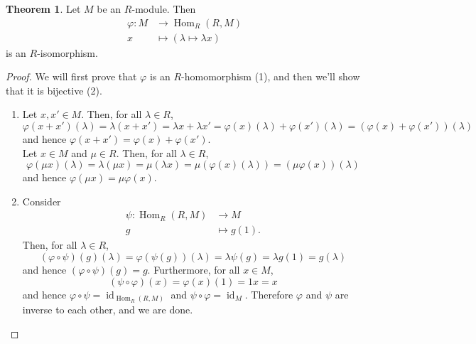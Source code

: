 \documentclass[12pt,a4paper]{report}
\theoremstyle{definition}
\newtheorem{theorem}{Theorem}[chapter] %
\theoremstyle{num.custom-title}
\DeclareMathOperator{\id}{id}
\DeclareMathOperator{\Hom}{Hom}
\renewcommand{\phi}{\varphi}
\begin{document}
\begin{theorem}
Let $M$ be an $R$-module. Then
\begin{align*}
\phi \colon M &\to \Hom_R(R,M) \\
x &\mapsto (\lambda \mapsto \lambda x)
\end{align*}
is an $R$-isomorphism.
\begin{proof}
We will first prove that $\phi$ is an $R$-homomorphism (1), and then we'll show that it is bijective (2).
\begin{enumerate}
\item Let $x,x' \in M$. Then, for all $\lambda \in R$,
\[
\phi(x+x')(\lambda) = \lambda(x+x') = \lambda x + \lambda x' = \phi(x)(\lambda)+\phi(x')(\lambda) = (\phi(x)+\phi(x'))(\lambda)
\]
and hence $\phi(x+x')=\phi(x)+\phi(x')$.\\
Let $x \in M$ and $\mu \in R$. Then, for all $\lambda \in R$,
\[
\phi(\mu x)(\lambda) = \lambda(\mu x) = \mu(\lambda x) = \mu(\phi(x)(\lambda)) = (\mu\phi(x))(\lambda)
\]
and hence $\phi(\mu x) = \mu \phi(x)$.
\item Consider 
\begin{align*}
\psi \colon \Hom_R(R,M) &\to M \\
g &\mapsto g(1).
\end{align*}
Then, for all $\lambda \in R$,
\[
(\phi \circ \psi)(g)(\lambda) = \phi(\psi(g))(\lambda) = \lambda \psi(g) = \lambda g(1) = g(\lambda)
\]
and hence $(\phi \circ \psi)(g)=g$. Furthermore, for all $x \in M$,
\[
(\psi \circ \phi)(x) = \phi(x)(1) = 1x = x
\]
and hence $\phi \circ \psi = \id_{\Hom_R(R,M)}$ and $\psi \circ \phi=\id_M$. Therefore $\phi$ and $\psi$ are inverse to each other, and we are done.
\end{enumerate}
\end{proof}
\end{theorem}
\end{document}
